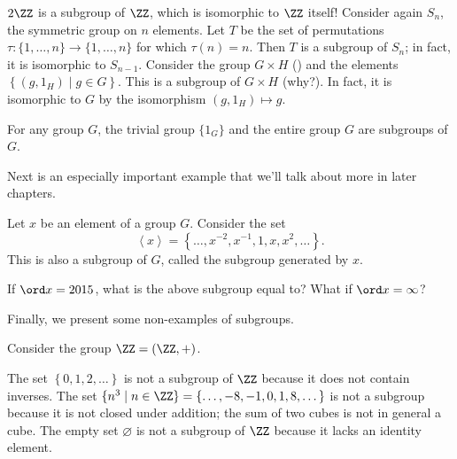 \begin{example}
	\listhack
	\begin{enumerate}[(a) ]
		\ii $2\ZZ$ is a subgroup of $\ZZ$, which is isomorphic to $\ZZ$ itself!
		\ii Consider again $S_n$, the symmetric group on $n$ elements.
		Let $T$ be the set of permutations $\tau \colon \{1, \dots, n\} \to \{1, \dots, n\}$
		for which $\tau(n) = n$.  Then $T$ is a subgroup of $S_n$;
		in fact, it is isomorphic to $S_{n-1}$.
		\ii Consider the group $G \times H$ ()
		and the elements $ \left\{ (g, 1_H) \mid g \in G \right\} $.
		This is a subgroup of $G \times H$ (why?).
		In fact, it is isomorphic to $G$
		by the isomorphism $(g,1_H) \mapsto g$.
	\end{enumerate}
\end{example}
\begin{example}
	For any group $G$, the trivial group $\{1_G\}$
	and the entire group $G$ are subgroups of $G$.
\end{example}

Next is an especially important example that we'll talk about more in later chapters.
\begin{example}
	Let $x$ be an element of a group $G$.
	Consider the set
	\[ \left<x\right> = \left\{ \dots, x^{-2}, x^{-1}, 1, x, x^2, \dots \right\}. \]
	This is also a subgroup of $G$, called the subgroup generated by $x$.
\end{example}
\begin{exercise}
	If $\ord x = 2015$, what is the above subgroup equal to?
	What if $\ord x = \infty$?
\end{exercise}

Finally, we present some non-examples of subgroups.
\begin{example}
	Consider the group $\ZZ = (\ZZ, +)$.
	\begin{enumerate}[(a)]
		\ii The set $\left\{ 0,1,2,\dots \right\}$ is
		not a subgroup of $\ZZ$ because it does not contain inverses.
		\ii The set $\{ n^3 \mid n \in \ZZ \}
		= \{ \dots, -8, -1, 0, 1, 8, \dots \}$ is not a subgroup
		because it is not closed under addition;
		the sum of two cubes is not in general a cube.
		\ii The empty set $\varnothing$ is not a subgroup
		of $\ZZ$ because it lacks an identity element.
	\end{enumerate}
\end{example}

